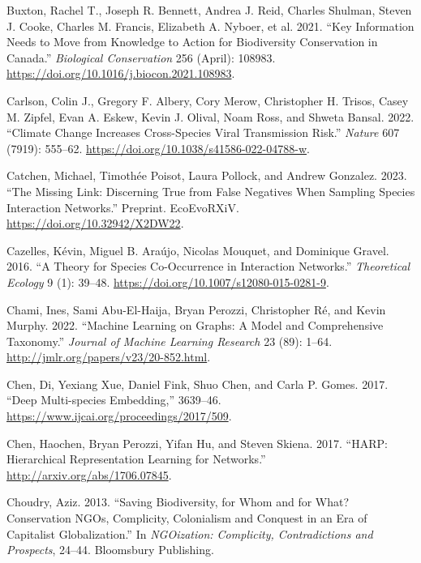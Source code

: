 \documentclass[
  letterpaper,
  DIV=11,
  numbers=noendperiod]{scrartcl}
\newlength{\cslhangindent}
\newlength{\cslentryspacingunit} %
\newenvironment{CSLReferences}[2] %
 {%
  \setlength{\parindent}{0pt}
  \ifodd #1
  \let\oldpar\par
  \def\par{\hangindent=\cslhangindent\oldpar}
  \fi
  \setlength{\parskip}{#2\cslentryspacingunit}
 }%
 {}
\begin{document}
\begin{CSLReferences}{1}{0}
\leavevmode{}%
Buxton, Rachel T., Joseph R. Bennett, Andrea J. Reid, Charles Shulman,
Steven J. Cooke, Charles M. Francis, Elizabeth A. Nyboer, et al. 2021.
{``Key Information Needs to Move from Knowledge to Action for
Biodiversity Conservation in {Canada}.''} \emph{Biological Conservation}
256 (April): 108983. \url{https://doi.org/10.1016/j.biocon.2021.108983}.

\leavevmode{}%
Carlson, Colin J., Gregory F. Albery, Cory Merow, Christopher H. Trisos,
Casey M. Zipfel, Evan A. Eskew, Kevin J. Olival, Noam Ross, and Shweta
Bansal. 2022. {``Climate Change Increases Cross-Species Viral
Transmission Risk.''} \emph{Nature} 607 (7919): 555--62.
\url{https://doi.org/10.1038/s41586-022-04788-w}.

\leavevmode{}%
Catchen, Michael, Timothée Poisot, Laura Pollock, and Andrew Gonzalez.
2023. {``The Missing Link: Discerning True from False Negatives When
Sampling Species Interaction Networks.''} Preprint. {EcoEvoRXiV}.
\url{https://doi.org/10.32942/X2DW22}.

\leavevmode{}%
Cazelles, Kévin, Miguel B. Araújo, Nicolas Mouquet, and Dominique
Gravel. 2016. {``A Theory for Species Co-Occurrence in Interaction
Networks.''} \emph{Theoretical Ecology} 9 (1): 39--48.
\url{https://doi.org/10.1007/s12080-015-0281-9}.

\leavevmode{}%
Chami, Ines, Sami Abu-El-Haija, Bryan Perozzi, Christopher Ré, and Kevin
Murphy. 2022. {``Machine {Learning} on {Graphs}: {A Model} and
{Comprehensive Taxonomy}.''} \emph{Journal of Machine Learning Research}
23 (89): 1--64. \url{http://jmlr.org/papers/v23/20-852.html}.

\leavevmode{}%
Chen, Di, Yexiang Xue, Daniel Fink, Shuo Chen, and Carla P. Gomes. 2017.
{``Deep {Multi-species Embedding},''} 3639--46.
\url{https://www.ijcai.org/proceedings/2017/509}.

\leavevmode{}%
Chen, Haochen, Bryan Perozzi, Yifan Hu, and Steven Skiena. 2017.
{``{HARP}: {Hierarchical Representation Learning} for {Networks}.''}
\url{http://arxiv.org/abs/1706.07845}.

\leavevmode{}%
Choudry, Aziz. 2013. {``Saving Biodiversity, for Whom and for What?
{Conservation NGOs}, Complicity, Colonialism and Conquest in an Era of
Capitalist Globalization.''} In \emph{{NGOization}: {Complicity},
Contradictions and Prospects}, 24--44. {Bloomsbury Publishing}.


\end{CSLReferences}
\end{document}
